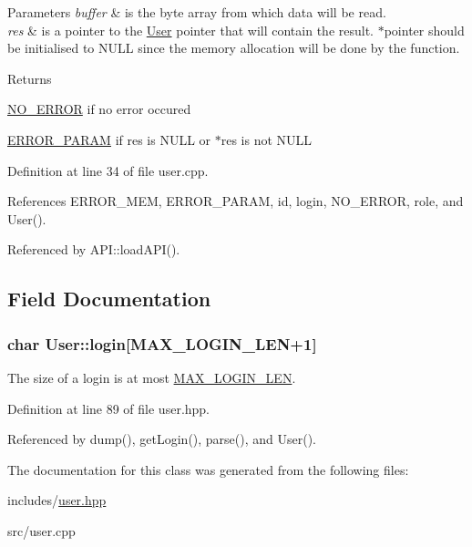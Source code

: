  
\begin{DoxyParams}{Parameters}
{\em buffer} & is the byte array from which data will be read. \\
\hline
{\em res} & is a pointer to the \hyperlink{classUser}{User} pointer that will contain the result. $\ast$pointer should be initialised to N\+U\+L\+L since the memory allocation will be done by the function. \\
\hline
\end{DoxyParams}
\begin{DoxyReturn}{Returns}

\begin{DoxyItemize}
\item \hyperlink{error_8hpp_acabd2917084445509becf54ab64a4bd0abf350750d0d4fabd8954c0f1e9bbae94}{N\+O\+\_\+\+E\+R\+R\+O\+R} if no error occured 
\item \hyperlink{error_8hpp_acabd2917084445509becf54ab64a4bd0a05718b630d7176e8e040eca44907b99f}{E\+R\+R\+O\+R\+\_\+\+P\+A\+R\+A\+M} if res is N\+U\+L\+L or $\ast$res is not N\+U\+L\+L 
\end{DoxyItemize}
\end{DoxyReturn}


 

Definition at line 34 of file user.\+cpp.



References E\+R\+R\+O\+R\+\_\+\+M\+E\+M, E\+R\+R\+O\+R\+\_\+\+P\+A\+R\+A\+M, id, login, N\+O\+\_\+\+E\+R\+R\+O\+R, role, and User().



Referenced by A\+P\+I\+::load\+A\+P\+I().



\subsection{Field Documentation}
\hypertarget{classUser_a1d1e3a5d1dcc02ae1c36c3311e8c25b4}{}
\subsubsection[{login}]{\setlength{\rightskip}{0pt plus 5cm}char User\+::login\mbox{[}{\bf M\+A\+X\+\_\+\+L\+O\+G\+I\+N\+\_\+\+L\+E\+N}+1\mbox{]}\hspace{0.3cm}{\ttfamily [private]}}\label{classUser_a1d1e3a5d1dcc02ae1c36c3311e8c25b4}
The size of a login is at most \hyperlink{user_8hpp_a43842dcd60d621d7d9c9b9e4ecd76f78}{M\+A\+X\+\_\+\+L\+O\+G\+I\+N\+\_\+\+L\+E\+N}. 

Definition at line 89 of file user.\+hpp.



Referenced by dump(), get\+Login(), parse(), and User().



The documentation for this class was generated from the following files\+:\begin{DoxyCompactItemize}
\item 
includes/\hyperlink{user_8hpp}{user.\+hpp}\item 
src/user.\+cpp\end{DoxyCompactItemize}
